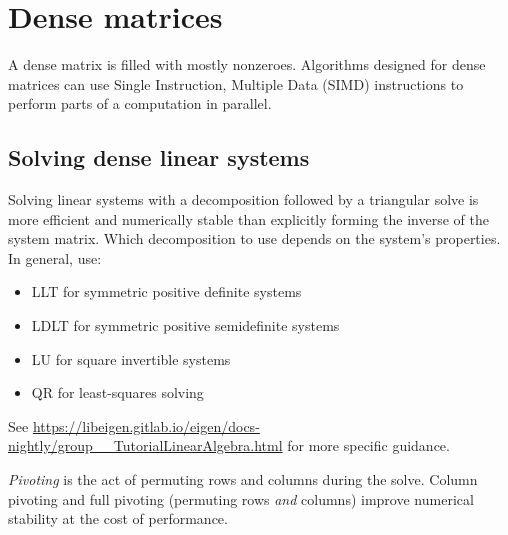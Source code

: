 \section{Dense matrices}

A dense matrix is filled with mostly nonzeroes. Algorithms designed for dense
matrices can use Single Instruction, Multiple Data (SIMD) instructions to
perform parts of a computation in parallel.

\subsection{Solving dense linear systems}

Solving linear systems with a decomposition followed by a triangular solve is
more efficient and numerically stable than explicitly forming the inverse of the
system matrix. Which decomposition to use depends on the system's properties.
In general, use:
\begin{itemize}
  \item LLT for symmetric positive definite systems
  \item LDLT for symmetric positive semidefinite systems
  \item LU for square invertible systems
  \item QR for least-squares solving
\end{itemize}

See
\url{https://libeigen.gitlab.io/eigen/docs-nightly/group__TutorialLinearAlgebra.html}
for more specific guidance.

\textit{Pivoting} is the act of permuting rows and columns during the solve.
Column pivoting and full pivoting (permuting rows \textit{and} columns) improve
numerical stability at the cost of performance.
